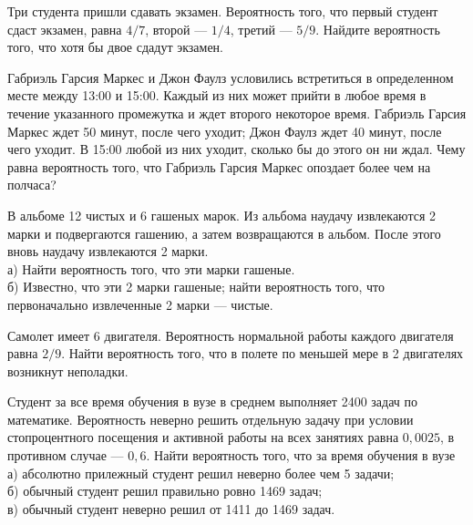 \newpage\setcounter{zad}{0}



\begin{zkrW}{20}\noindent 
	Три студента пришли сдавать экзамен. Вероятность того, что первый студент сдаст экзамен, равна $4/7$, второй --- $1/4$, третий --- $5/9$. Найдите вероятность того, что хотя бы двое сдадут экзамен.
 
\end{zkrW}

\begin{zkrW}{20}\noindent 
	Габриэль Гарсия Маркес и Джон Фаулз условились встретиться в определенном месте между 13:00 и 15:00. Каждый из них может прийти в любое время в течение указанного промежутка и ждет второго некоторое время. Габриэль Гарсия Маркес ждет 50 минут, после чего уходит; Джон Фаулз ждет 40 минут, после чего уходит. В 15:00 любой из них уходит, сколько бы до этого он ни ждал. Чему равна вероятность того, что Габриэль Гарсия Маркес опоздает более чем на полчаса?
 
\end{zkrW}

\begin{zkrW}{20}\noindent 
	В альбоме 12 чистых и 6 гашеных марок. Из альбома наудачу извлекаются 2 марки и подвергаются гашению, а затем возвращаются в альбом. После этого вновь наудачу извлекаются 2 марки. \\ \indent а) Найти вероятность того, что эти марки гашеные. \\ \indent б) Известно, что эти 2 марки гашеные; найти вероятность того, что первоначально извлеченные 2 марки --- чистые.
 
\end{zkrW}

\begin{zkrW}{20}\noindent 
	Самолет имеет 6 двигателя. Вероятность нормальной работы каждого двигателя равна $2/9$. Найти вероятность того, что в полете по меньшей мере в 2 двигателях возникнут неполадки.
 
\end{zkrW}

\begin{zkrW}{20}\noindent 
	Студент за все время обучения в вузе в среднем выполняет 2400 задач по математике. Вероятность неверно решить отдельную задачу при условии стопроцентного посещения и активной работы на всех занятиях равна $0{,}0025$, в противном случае --- $0{,}6$. Найти вероятность того, что за время обучения в вузе \\ \indent а) абсолютно прилежный студент решил неверно более чем 5 задачи; \\ \indent б) обычный студент решил правильно ровно 1469 задач; \\ \indent в) обычный студент неверно решил от 1411 до 1469 задач.
 
\end{zkrW}

\newpage\setcounter{zad}{0}

